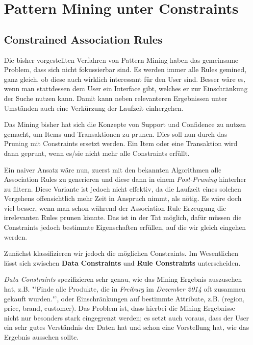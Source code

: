 \section{Pattern Mining unter Constraints}
\subsection{Constrained Association Rules}
Die bisher vorgestellten Verfahren von Pattern Mining
haben das gemeinsame Problem, dass sich nicht fokussierbar
sind. Es werden immer alle Rules gemined, ganz gleich, ob
diese auch wirklich interessant für den User sind. Besser
wäre es, wenn man stattdessen dem User ein Interface gibt,
welches er zur Einschränkung der Suche nutzen kann. Damit
kann neben relevanteren Ergebnissen unter Umständen auch
eine Verkürzung der Laufzeit einhergehen. 

Das Mining bisher hat sich die Konzepte von Support und
Confidence zu nutzen gemacht, um Items und Transaktionen
zu prunen. Dies soll nun durch das Pruning mit Constraints
ersetzt werden. Ein Item oder eine Transaktion wird dann
geprunt, wenn es/sie nicht mehr alle Constraints erfüllt.

Ein naiver Ansatz wäre nun, zuerst mit den bekannten 
Algorithmen alle Association Rules zu generieren und diese
dann in einem \textit{Post-Pruning} hinterher zu filtern.
Diese Variante ist jedoch nicht effektiv, da
die Laufzeit eines solchen Vergehens offensichtlich mehr
Zeit in Anspruch nimmt, als nötig. Es wäre doch viel besser,
wenn man schon während der Association Rule Erzeugung
die irrelevanten Rules prunen könnte. Das ist in der Tat
möglich, dafür müssen die Constraints jedoch bestimmte
Eigenschaften erfüllen, auf die wir gleich eingehen werden.

Zunächst klassifizieren wir jedoch die möglichen Constraints.
Im Wesentlichen lässt sich zwischen \textbf{Data Constraints}
und \textbf{Rule Constraints} unterscheiden.

\textit{Data Constraints} spezifizieren sehr genau, wie das
Mining Ergebnis auszusehen hat, z.B. "'Finde alle Produkte,
die in \textit{Freiburg} im \textit{Dezember 2014} oft
zusammen gekauft wurden."', oder Einschränkungen auf 
bestimmte Attribute, z.B. (region, price, brand, customer).
Das Problem ist, dass hierbei die Mining Ergebnisse nicht
nur besonders stark eingegrenzt werden; es setzt auch voraus,
dass der User ein sehr gutes Verständnis der Daten hat und
schon eine Vorstellung hat, wie das Ergebnis aussehen sollte.

